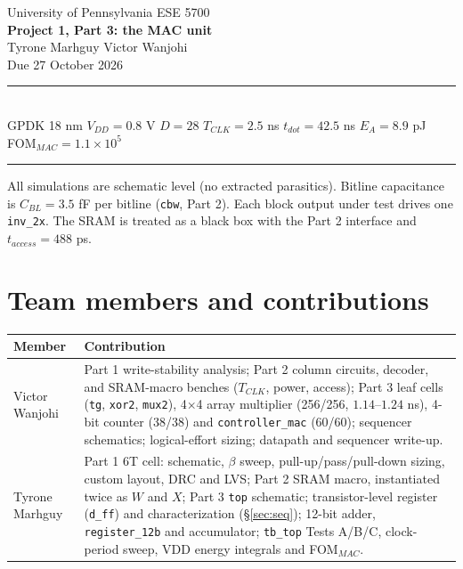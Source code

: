 \documentclass[10pt,letterpaper]{article}
\newcommand{\code}[1]{\texttt{#1}}
\newcommand{\sref}[1]{\S\ref{#1}}
\begin{document}
\begin{center}
{\small University of Pennsylvania \quad ESE 5700}\\[8pt]
{\LARGE\bfseries Project 1, Part 3: the MAC unit}\\[6pt]
Tyrone Marhguy \quad\textbullet\quad Victor Wanjohi\\[2pt]
{\small Due 27 October 2026}\\[8pt]
\rule{\linewidth}{0.4pt}\\[5pt]
{\small GPDK 18 nm \quad $V_{DD}=0.8$ V \quad $D=28$ \quad $T_{CLK}=2.5$ ns \quad $t_{dot}=42.5$ ns \quad $E_A=8.9$ pJ \quad FOM$_{MAC}=1.1\times10^{5}$}\\[5pt]
\rule{\linewidth}{0.4pt}
\end{center}

\vspace{0.45em}
{\small\noindent All simulations are schematic level (no extracted parasitics). Bitline capacitance is $C_{BL}=3.5$ fF per bitline (\code{cbw}, Part 2). Each block output under test drives one \code{inv\_2x}. The SRAM is treated as a black box with the Part 2 interface and $t_{access}=488$ ps.}
\vspace{0.45em}
{}
\tableofcontents

\clearpage
\section{Team members and contributions}\label{sec:team}
\begin{tabularx}{\linewidth}{@{}lX@{}}\toprule Member & Contribution\\\midrule
Victor Wanjohi &
Part 1 write-stability analysis;
Part 2 column circuits, decoder, and SRAM-macro benches ($T_{CLK}$, power, access);
Part 3 leaf cells (\code{tg}, \code{xor2}, \code{mux2}), 4$\times$4 array multiplier (256/256, $1.14$--$1.24$ ns), 4-bit counter (38/38) and \code{controller\_mac} (60/60);
sequencer schematics;
logical-effort sizing;
datapath and sequencer write-up.\\\addlinespace[0.7em]
Tyrone Marhguy &
Part 1 6T cell: schematic, $\beta$ sweep, pull-up/pass/pull-down sizing, custom layout, DRC and LVS;
Part 2 SRAM macro, instantiated twice as $W$ and $X$;
Part 3 \code{top} schematic;
transistor-level register (\code{d\_ff}) and characterization (\sref{sec:seq});
12-bit adder, \code{register\_12b} and accumulator;
\code{tb\_top} Tests A/B/C, clock-period sweep, VDD energy integrals and FOM$_{MAC}$.\\
\bottomrule\end{tabularx}
\end{document}
